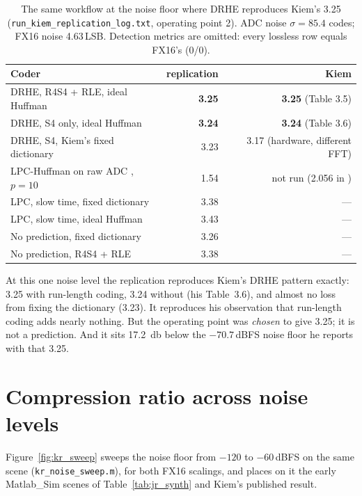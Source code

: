 \begin{table}[htbp]
\centering
\caption[Replication at $-87.9$\,dBFS]{The same workflow at the noise floor
where DRHE reproduces Kiem's 3.25 (\texttt{run\_kiem\_replication\_log.txt},
operating point 2). ADC noise $\sigma = 85.4$ codes; FX16 noise 4.63\,LSB.
Detection metrics are omitted: every lossless row equals FX16's (0/0).}
\label{tab:kr_m88}
\small
\begin{tabular}{@{}lrr@{}}
\toprule
Coder & replication & Kiem\\
\midrule
DRHE, R4S4 + RLE, ideal Huffman     & \textbf{3.25} & \textbf{3.25} (Table 3.5)\\
DRHE, S4 only, ideal Huffman        & \textbf{3.24} & \textbf{3.24} (Table 3.6)\\
DRHE, S4, Kiem's fixed dictionary   & 3.23 & 3.17 (hardware, different FFT)\\
LPC-Huffman on raw ADC \cite{meucci2022}, $p=10$ & 1.54 & not run (2.056 in \cite{meucci2022})\\
LPC, slow time, fixed dictionary    & 3.38 & ---\\
LPC, slow time, ideal Huffman       & 3.43 & ---\\
No prediction, fixed dictionary     & 3.26 & ---\\
No prediction, R4S4 + RLE           & 3.38 & ---\\
\bottomrule
\end{tabular}
\end{table}

\noindent
At this one noise level the replication reproduces Kiem's DRHE pattern
exactly: 3.25 with run-length coding, 3.24 without (his Table~3.6), and almost
no loss from fixing the dictionary (3.23). It reproduces his observation that
run-length coding adds nearly nothing. But the operating point was
\emph{chosen} to give 3.25; it is not a prediction. And it sits
\SI{17.2}{\decibel} below the $-70.7$\,dBFS noise floor he reports with that
3.25.

\section{Compression ratio across noise levels}
\label{sec:kr_sweep}

Figure~\ref{fig:kr_sweep} sweeps the noise floor from $-120$ to $-60$\,dBFS
on the same scene (\texttt{kr\_noise\_sweep.m}), for both FX16 scalings, and
places on it the early Matlab\_Sim scenes of Table~\ref{tab:jr_synth} and
Kiem's published result.

